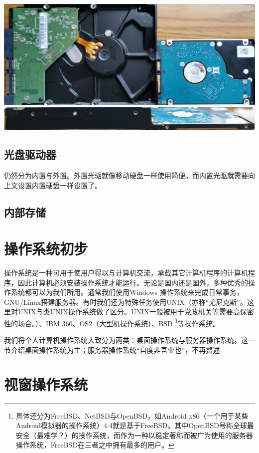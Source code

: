 \begin{center}
	\includegraphics[scale=0.1]{pic/HD2}\\\includegraphics[scale=0.1]{pic/HD3}	
\end{center} \par
\subsection{光盘驱动器}
仍然分为内置与外置。外置光驱就像移动硬盘一样使用简便。而内置光驱就需要向上文设置内置硬盘一样设置了。
\subsection{内部存储}
\section{操作系统初步}
操作系统是一种可用于使用户得以与计算机交流，承载其它计算机程序的计算机程序，因此计算机必须安装操作系统才能运行。无论是国内还是国外，多种优秀的操作系统都可以为我们所用。通常我们使用Windows 操作系统来完成日常事务，GNU/Linux搭建服务器。有时我们还为特殊任务使用UNIX（亦称“尤尼克斯”。这里对UNIX与类UNIX操作系统做了区分。UNIX一般被用于党政机关等需要高保密性的场合。）、IBM 360、OS2（大型机操作系统）、BSD \footnote{具体还分为FreeBSD、NetBSD与OpenBSD，如Android x86（一个用于某些Android模拟器的操作系统）4.4就是基于FreeBSD。其中OpenBSD号称全球最安全（最难学？）的操作系统，而作为一种以稳定著称而被广为使用的服务器操作系统，FreeBSD在三者之中拥有最多的用户。}等操作系统。\par
我们将个人计算机操作系统大致分为两类：桌面操作系统与服务器操作系统。这一节介绍桌面操作系统为主；服务器操作系统“自度非吾业也”，不再赘述
\section{视窗操作系统}
